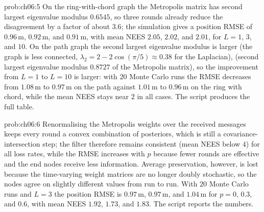 \begin{sol}{prob:ch06:5}
On the ring-with-chord graph the Metropolis matrix has second largest eigenvalue modulus $0.6545$, so three rounds already reduce the disagreement by a factor of about $3.6$; the simulation gives a position RMSE of $0.96$\,m, $0.92$\,m, and $0.91$\,m, with mean NEES $2.05$, $2.02$, and $2.01$, for $L=1$, $3$, and $10$. On the path graph the second largest eigenvalue modulus is larger (the graph is less connected, $\lambda_2=2-2\cos(\pi/5)\approx0.38$ for the Laplacian), (second largest eigenvalue modulus $0.8727$ of the Metropolis matrix), so the improvement from $L=1$ to $L=10$ is larger: with $20$ Monte Carlo runs the RMSE decreases from $1.08$\,m to $0.97$\,m on the path against $1.01$\,m to $0.96$\,m on the ring with chord, while the mean NEES stays near $2$ in all cases. The script  produces the full table.
\end{sol}

\begin{sol}{prob:ch06:6}
Renormalising the Metropolis weights over the received messages keeps every round a convex combination of posteriors, which is still a covariance-intersection step; the filter therefore remains consistent (mean NEES below $4$) for all loss rates, while the RMSE increases with $p$ because fewer rounds are effective and the end nodes receive less information. Average preservation, however, is lost because the time-varying weight matrices are no longer doubly stochastic, so the nodes agree on slightly different values from run to run. With $20$ Monte Carlo runs and $L=3$ the position RMSE is $0.97$\,m, $0.97$\,m, and $1.04$\,m for $p=0$, $0.3$, and $0.6$, with mean NEES $1.92$, $1.73$, and $1.83$. The script  reports the numbers.
\end{sol}

